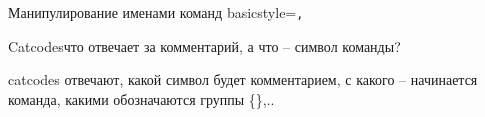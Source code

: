 \begin{frame}[fragile]{Манипулирование именами команд\magicPage}\relax
     \lstset
    {
        basicstyle=\tt\normalsize,
    }
\end{frame}

\begin{frame}[fragile]{Catcodes\magicPage}{что отвечает за комментарий, а что -- символ команды?}\relax
    
    catcodes отвечают, какой символ будет комментарием, с какого -- начинается команда, какими обозначаются группы \{\},..
\end{frame}

